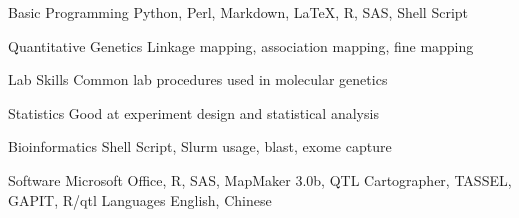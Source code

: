 


\begin{cvskills}




\cvskill
{Basic Programming} %
{Python, Perl, Markdown, LaTeX, R, SAS, Shell Script} %


\cvskill
{Quantitative Genetics} %
{Linkage mapping, association mapping, fine mapping} %

\cvskill
{Lab Skills} %
{Common lab procedures used in molecular genetics} %

\cvskill
{Statistics} %
{Good at experiment design and statistical analysis} %

\cvskill
{Bioinformatics} %
{Shell Script, Slurm usage, blast, exome capture} %

\cvskill
{Software} %
{Microsoft Office, R, SAS, MapMaker 3.0b, QTL Cartographer, TASSEL, GAPIT, R/qtl} %
\cvskill
{Languages} %
{English, Chinese}

\end{cvskills}